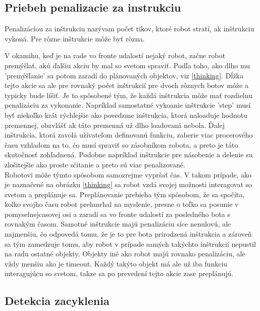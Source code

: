 \subsection{Priebeh penalizacie za instrukciu}
\begin{definicia}
Penalizáciou za inštrukciu nazývam počet tikov, ktoré robot stratí, ak inštrukciu vykoná. Pre rôzne inštrukcie môže byť rôzna.
\end{definicia}
\indent
V okamihu, keď je na rade vo fronte udalostí nejaký robot, začne robot premýšlať, akú ďalšiu akciu by mal so svetom spraviť. Podľa toho, ako dlho mu 'premýšľanie' sa potom zaradí do plánovaných objektov, viz \ref{thinking}. Dĺžka tejto akcie sa ale pre rovnaký počet inštrukcií pre dvoch rôznych botov môže a typicky bude líšiť. Je to spôsobené tým, že každá inštrukcia môže mať rozdielnu penalizáciu za vykonanie. Napríklad samostatné vykoanie inštrukcie 'step' musí byť niekoľko krát rýchlejšie ako povedzme inštrukcia, ktorá naloaduje hodnotu premennej, obzvlášť ak táto premenná už dlho loadovaná nebola. Ďalej inštrukcia, ktorá zavolá užívateľom definovanú funkciu, zaberie viac procerového času vzhladom na to, ćo musí spraviť so zásobníkom robota, a preto je táto skutočnosť zohľadnená. Podobne napríklad inštrukcie pre násobenie a delenie su zlošitejšie ako proste sčitanie a preto sú viac penalizované.\\
\indent
Robotovi môže týmto spôsobom samozrejme vypršať čas. V takom prípade, ako je naznačené na obrázku \ref{thinking} sa robot vzdá svojej možnosti interagovat so svetom a preplánuje sa. Preplánovanie prebieha tým spôsobom, že sa spočíta, kolko svojho času robot prehmrhal na myslenie, presne o toľko sa posunie v pomyselnejcasovej osi a zaradí sa vo fronte udalostí za posledného bota s rovnakým časom. Samotné inštrukcie majú penalizáciu síce nenulovú, ale najmenšiu, čo odpovedá tomu, že je to pre bota prirodzená inštrukcia a zároveň sa tým zamedzuje tomu, aby robot v prípade samých takýchto inštrukcií nepustil na radu ostatné objekty. Objekty iné ako robot majú rovnako penalizáciu, ale vždy menšiu ako je timeout. Každý takýto objekt má ale už iba funkciu interagujúcu so svetom, takze sa po prevedení tejto akcie zase preplánujú.\\

\subsection{Detekcia zacyklenia}

